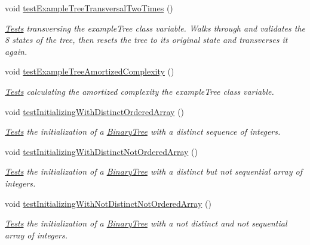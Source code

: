 \begin{DoxyCompactItemize}
void \hyperlink{class_binary_tree_amortized_analyis_1_1_tests_1_1_binary_tree_tests_a86fababa7468cd991c828fb848ee9624}{test\+Example\+Tree\+Transversal\+Two\+Times} ()
\begin{DoxyCompactList}\small\item\em \hyperlink{namespace_binary_tree_amortized_analyis_1_1_tests}{Tests} transversing the example\+Tree class variable. Walks through and validates the 8 states of the tree, then resets the tree to its original state and transverses it again. \end{DoxyCompactList}\item 
void \hyperlink{class_binary_tree_amortized_analyis_1_1_tests_1_1_binary_tree_tests_a5cf9234707d858f25808b7ff8dcf8c89}{test\+Example\+Tree\+Amortized\+Complexity} ()
\begin{DoxyCompactList}\small\item\em \hyperlink{namespace_binary_tree_amortized_analyis_1_1_tests}{Tests} calculating the amortized complexity the example\+Tree class variable. \end{DoxyCompactList}\item 
void \hyperlink{class_binary_tree_amortized_analyis_1_1_tests_1_1_binary_tree_tests_a834e504a0b51456197a8a77ef62e39d1}{test\+Initializing\+With\+Distinct\+Ordered\+Array} ()
\begin{DoxyCompactList}\small\item\em \hyperlink{namespace_binary_tree_amortized_analyis_1_1_tests}{Tests} the initialization of a \hyperlink{class_binary_tree_amortized_analyis_1_1_binary_tree}{Binary\+Tree} with a distinct sequence of integers. \end{DoxyCompactList}\item 
void \hyperlink{class_binary_tree_amortized_analyis_1_1_tests_1_1_binary_tree_tests_ad3f7a2e6398108a21c1d8b11b2519aa1}{test\+Initializing\+With\+Distinct\+Not\+Ordered\+Array} ()
\begin{DoxyCompactList}\small\item\em \hyperlink{namespace_binary_tree_amortized_analyis_1_1_tests}{Tests} the initialization of a \hyperlink{class_binary_tree_amortized_analyis_1_1_binary_tree}{Binary\+Tree} with a distinct but not sequential array of integers. \end{DoxyCompactList}\item 
void \hyperlink{class_binary_tree_amortized_analyis_1_1_tests_1_1_binary_tree_tests_af51e43ffdc8ab2d400bbec60799766aa}{test\+Initializing\+With\+Not\+Distinct\+Not\+Ordered\+Array} ()
\begin{DoxyCompactList}\small\item\em \hyperlink{namespace_binary_tree_amortized_analyis_1_1_tests}{Tests} the initialization of a \hyperlink{class_binary_tree_amortized_analyis_1_1_binary_tree}{Binary\+Tree} with a not distinct and not sequential array of integers. \end{DoxyCompactList}\item 

\end{DoxyCompactItemize}
